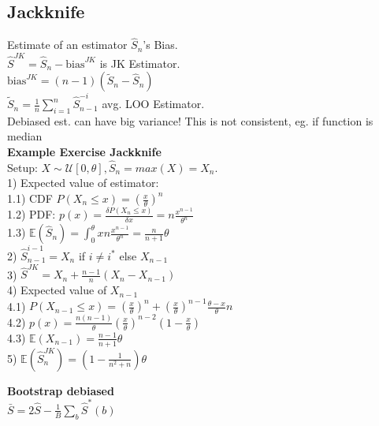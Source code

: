\subsection*{Jackknife}
Estimate of an estimator $\hat{S}_n$'s Bias.\\
$\hat{S}^{JK}=\hat{S}_n-\mathrm{bias}^{JK}$ is JK Estimator.\\
$\mathrm{bias}^{JK}{=}(n{-}1)(\tilde{S}_n{-}\hat{S}_n)$\\
$\tilde{S}_n{=}\frac{1}{n}\sum_{i=1}^n\hat{S}_{n{-}1}^{-i}$ avg. LOO Estimator. \\
Debiased est. can have big variance! This is not consistent, eg. if function is median\\
\textbf{Example Exercise Jackknife} \\
Setup: $X \sim \mathcal{U}[0, \theta], \hat S_n = max(X) = X_n$. \\
1) Expected value of estimator: \\
1.1) CDF $P(X_n \leq x) = (\frac{x}{\theta})^n$ \\
1.2) PDF: $p(x) = \frac{\delta P(X_n \leq x)}{\delta x} = n \frac{x^{n-1}}{\theta^n}$ \\
1.3) $\mathbb{E}(\hat S_n) = \int_0^\theta x n \frac{x^{n-1}}{\theta^n} = \frac{n}{n+1}\theta$ \\
2) $\hat S_{n-1}^{i-1} = X_n$ if $i \neq i^*$ else $X_{n-1}$\\
3) $\hat S^{JK} = X_n+\frac{n-1}{n}(X_n - X_{n-1})$ \\
4) Expected value of $X_{n-1}$ \\
4.1) $P(X_{n-1} \leq x) = (\frac{x}{\theta})^n + (\frac{x}{\theta})^{n-1}\frac{\theta-x}{\theta}n$ \\
4.2) $p(x) = \frac{n(n-1)}{\theta}(\frac{x}{\theta})^{n-2}(1-\frac{x}{\theta})$\\
4.3) $\mathbb{E}(X_{n-1})= \frac{n-1}{n+1}\theta$ \\
5) $\mathbb{E}(\hat S_n^{JK}) = (1-\frac{1}{n^2+n})\theta$

\textbf{Bootstrap debiased}\\ $\bar{S}{=}2\hat{S}{-}\frac{1}{B}\sum_b\hat{S}^*(b)$
%
